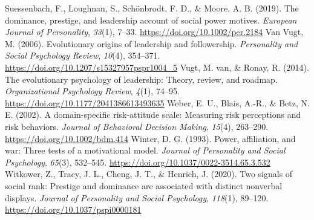 \documentclass[
  donotrepeattitle,doc, 12pt, a4paper,floatsintext]{apa7}
\newlength{\cslhangindent}
\newlength{\cslentryspacingunit} %
\newenvironment{CSLReferences}[2] %
 {%
  \setlength{\parindent}{0pt}
  \ifodd #1
  \let\oldpar\par
  \def\par{\hangindent=\cslhangindent\oldpar}
  \fi
  \setlength{\parskip}{#2\cslentryspacingunit}
 }%
 {}
\begin{document}
\begin{CSLReferences}{1}{0}
\leavevmode{}%
Suessenbach, F., Loughnan, S., Schönbrodt, F. D., \& Moore, A. B. (2019). The dominance, prestige, and leadership account of social power motives. \emph{European Journal of Personality}, \emph{33}(1), 7--33. \url{https://doi.org/10.1002/per.2184}
\leavevmode{}%
Van Vugt, M. (2006). Evolutionary origins of leadership and followership. \emph{Personality and Social Psychology Review}, \emph{10}(4), 354--371. \url{https://doi.org/10.1207/s15327957pspr1004_5}
\leavevmode{}%
Vugt, M. van, \& Ronay, R. (2014). The evolutionary psychology of leadership: Theory, review, and roadmap. \emph{Organizational Psychology Review}, \emph{4}(1), 74--95. \url{https://doi.org/10.1177/2041386613493635}
\leavevmode{}%
Weber, E. U., Blais, A.-R., \& Betz, N. E. (2002). A domain-specific risk-attitude scale: Measuring risk perceptions and risk behaviors. \emph{Journal of Behavioral Decision Making}, \emph{15}(4), 263--290. \url{https://doi.org/10.1002/bdm.414}
\leavevmode{}%
Winter, D. G. (1993). Power, affiliation, and war: Three tests of a motivational model. \emph{Journal of Personality and Social Psychology}, \emph{65}(3), 532--545. \url{https://doi.org/10.1037/0022-3514.65.3.532}
\leavevmode{}%
Witkower, Z., Tracy, J. L., Cheng, J. T., \& Henrich, J. (2020). Two signals of social rank: Prestige and dominance are associated with distinct nonverbal displays. \emph{Journal of Personality and Social Psychology}, \emph{118}(1), 89--120. \url{https://doi.org/10.1037/pspi0000181}
\end{CSLReferences}
\end{document}
